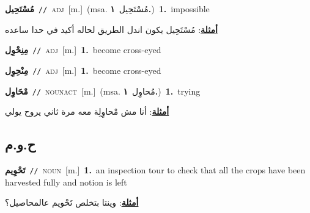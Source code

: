 \documentclass[10pt,a4paper,twoside]{article} %
\begin{document}
\begin{multicols}{2}
{\setlength\topsep{0pt}\textbf{\foreignlanguage{arabic}{مُسْتَحِيل}}\ {\color{gray}\texttt{//}\color{black}}\ \textsc{adj}\ [m.]\ \color{gray}(msa. \foreignlanguage{arabic}{مُسْتَحِيل}~\foreignlanguage{arabic}{\textbf{١.}})\color{black}\ \textbf{1.}~impossible\  \begin{flushright}\color{gray}\foreignlanguage{arabic}{\textbf{\underline{\foreignlanguage{arabic}{أمثلة}}}: مُسْتَحِيل يكون اندل الطريق لحاله أكيد في حدا ساعده}\end{flushright}\color{black}} \vspace{2mm}

{\setlength\topsep{0pt}\textbf{\foreignlanguage{arabic}{مِنِحْوِل}}\ {\color{gray}\texttt{//}\color{black}}\ \textsc{adj}\ [m.]\ \textbf{1.}~become cross-eyed\ } \vspace{2mm}

{\setlength\topsep{0pt}\textbf{\foreignlanguage{arabic}{مِنْحِوِل}}\ {\color{gray}\texttt{//}\color{black}}\ \textsc{adj}\ [m.]\ \textbf{1.}~become cross-eyed\ } \vspace{2mm}

{\setlength\topsep{0pt}\textbf{\foreignlanguage{arabic}{مْحَاوِل}}\ {\color{gray}\texttt{//}\color{black}}\ \textsc{noun\textunderscore act}\ [m.]\ \color{gray}(msa. \foreignlanguage{arabic}{مُحاوِل}~\foreignlanguage{arabic}{\textbf{١.}})\color{black}\ \textbf{1.}~trying\  \begin{flushright}\color{gray}\foreignlanguage{arabic}{\textbf{\underline{\foreignlanguage{arabic}{أمثلة}}}: أنا مش مْحاوِلِة معه مرة ثاني يروح يولي}\end{flushright}\color{black}} \vspace{2mm}

\vspace{-3mm}
\subsection*{\color{blue}\foreignlanguage{arabic}{ح.و.م}\color{blue}{}} 

{\setlength\topsep{0pt}\textbf{\foreignlanguage{arabic}{تَحْوِيم}}\ {\color{gray}\texttt{//}\color{black}}\ \textsc{noun}\ [m.]\ \textbf{1.}~an inspection tour to check that all the crops have been harvested fully and notion is left\  \begin{flushright}\color{gray}\foreignlanguage{arabic}{\textbf{\underline{\foreignlanguage{arabic}{أمثلة}}}: وينتا بتخلص تَحْويم عالمحاصيل؟}\end{flushright}\color{black}} \vspace{2mm}


\end{multicols}
\end{document}
